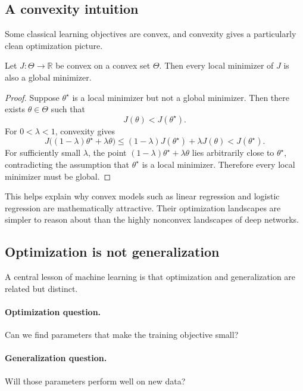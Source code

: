 \subsection*{A convexity intuition}

Some classical learning objectives are convex, and convexity gives a particularly clean optimization picture.

\begin{proposition}
Let $J:\Theta\to\mathbb R$ be convex on a convex set $\Theta$. Then every local minimizer of $J$ is also a global minimizer.
\end{proposition}

\begin{proof}
Suppose $\theta^\star$ is a local minimizer but not a global minimizer. Then there exists $\theta\in\Theta$ such that
\[
J(\theta)<J(\theta^\star).
\]
For $0<\lambda<1$, convexity gives
\[
J\big((1-\lambda)\theta^\star+\lambda\theta\big)
\le
(1-\lambda)J(\theta^\star)+\lambda J(\theta)
<
J(\theta^\star).
\]
For sufficiently small $\lambda$, the point $(1-\lambda)\theta^\star+\lambda\theta$ lies arbitrarily close to $\theta^\star$, contradicting the assumption that $\theta^\star$ is a local minimizer. Therefore every local minimizer must be global.
\end{proof}

This helps explain why convex models such as linear regression and logistic regression are mathematically attractive. Their optimization landscapes are simpler to reason about than the highly nonconvex landscapes of deep networks.

\subsection*{Optimization is not generalization}

A central lesson of machine learning is that optimization and generalization are related but distinct.

\paragraph{Optimization question.}
Can we find parameters that make the training objective small?

\paragraph{Generalization question.}
Will those parameters perform well on new data?

